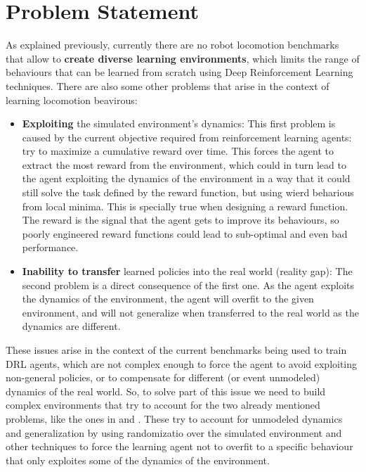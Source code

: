 \figDrlBenchmarks

\section{Problem Statement}
\label{sec:problem}

As explained previously, currently there are no robot locomotion benchmarks that allow
to \textbf{create diverse learning environments}, which limits the range of behaviours that can be learned
from scratch using Deep Reinforcement Learning techniques. There are also some other problems that arise in the
context of learning locomotion beavirous:

\begin{itemize}
	\item \textbf{Exploiting} the simulated environment's dynamics: 
			This first problem is caused by the current objective required from reinforcement learning agents: try to maximize
			a cumulative reward over time. This forces the agent to extract the most reward from the environment, which could in
			turn lead to the agent exploiting the dynamics of the environment in a way that it could still solve the task defined by the reward function,
			but using wierd beharious from local minima. This is specially true when designing a reward function. The reward is the signal
			that the agent gets to improve its behaviours, so poorly engineered reward functions could lead to sub-optimal and even bad performance.
	\item \textbf{Inability to transfer} learned  policies into the real world (reality gap):
			The second problem is a direct consequence of the first one. As the agent exploits the 
			dynamics of the environment, the agent will overfit to the given environment, and will 
			not generalize when transferred to the real world as the dynamics are different.
\end{itemize}

These issues arise in the context of the current benchmarks being used to train DRL agents, which are not complex enough to
force the agent to avoid exploiting non-general policies, or to compensate for different (or event unmodeled) dynamics of the real world.
So, to solve part of this issue we need to build complex environments that try to account for the two already mentioned problems, like the ones
in \citeauthor{GoogleBrainSim2Real} and \citeauthor{OpenAISim2real}. These try to account for unmodeled dynamics and generalization by
using randomizatio over the simulated environment and other techniques to force the learning agent not to overfit to a specific behaviour that
only exploites some of the dynamics of the environment.


